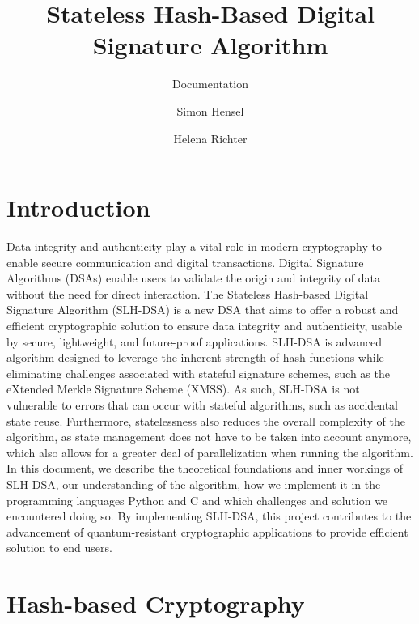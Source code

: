 \documentclass[journal=tosc,notanonymous]{iacrtrans}
\author{Simon Hensel\inst{1} \and Helena Richter\inst{2}}
\institute{Albstadt-Sigmaringen University, Albstadt, Germany, \email{hensels1@hs-albsig.de} \and
	Albstadt-Sigmaringen University, Albstadt, Germany, \email{richtehe@hs-albsig.de}}
\title{Stateless Hash-Based Digital Signature Algorithm}
\subtitle{Documentation}
\begin{document}
\maketitle




\begin{abstract}
  \lipsum[1]
\end{abstract}


\section{Introduction}

Data integrity and authenticity play a vital role in modern cryptography to enable secure communication and digital transactions.
Digital Signature Algorithms (DSAs) enable users to validate the origin and integrity of data without the need for direct interaction.
The Stateless Hash-based Digital Signature Algorithm (SLH-DSA) is a new DSA that aims to offer a robust and efficient cryptographic solution to ensure data integrity and authenticity, usable by secure, lightweight, and future-proof applications.
SLH-DSA is advanced algorithm designed to leverage the inherent strength of hash functions while eliminating challenges associated with stateful signature schemes, such as the eXtended Merkle Signature Scheme (XMSS).
As such, SLH-DSA is not vulnerable to errors that can occur with stateful algorithms, such as accidental state reuse.
Furthermore, statelessness also reduces the overall complexity of the algorithm, as state management does not have to be taken into account anymore, which also allows for a greater deal of parallelization when running the algorithm.
\\
In this document, we describe the theoretical foundations and inner workings of SLH-DSA, our understanding of the algorithm, how we implement it in the programming languages Python and C and which challenges and solution we encountered doing so.
By implementing SLH-DSA, this project contributes to the advancement of quantum-resistant cryptographic applications to provide efficient solution to end users.

\section{Hash-based Cryptography}
\end{document}
